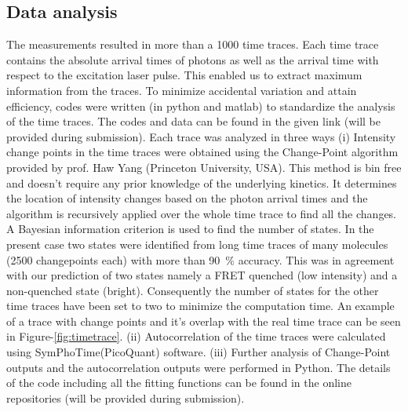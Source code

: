 \documentclass[journal=jacsat,manuscript=article]{achemso}
\begin{document}
\subsection{Data analysis}
The measurements resulted in more than a 1000 time traces.
Each time trace contains the absolute arrival times of photons as well as the arrival time with respect to the excitation laser pulse.
This enabled us to extract maximum information from the traces.
To minimize accidental variation and attain efficiency, codes were written (in python and matlab) to standardize the analysis of the time traces.
The codes and data can be found in the given link (will be provided during submission).
Each trace was analyzed in three ways (i) Intensity change points in the time traces were obtained using the Change-Point algorithm\cite{watkins2005detection} provided by prof. Haw Yang 
(Princeton University, USA).
This method is bin free and doesn't require any prior knowledge of the underlying kinetics.
It determines the location of intensity changes based on the photon arrival times and the algorithm is recursively applied over the whole time trace to find all the changes.
A Bayesian information criterion is used to find the number of states.
In the present case two states were identified from long time traces of many molecules (2500 changepoints each) with more than \SI{90}{\percent} accuracy.
This was in agreement with our prediction of two states namely a FRET quenched (low intensity) and a non-quenched state (bright).
Consequently the number of states for the other time traces have been set to two to minimize the computation time.
An example of a trace with change points and it's overlap with the real time trace can be seen in Figure-\ref{fig:timetrace}.
(ii) Autocorrelation of the time traces were calculated using SymPhoTime(PicoQuant) software.
(iii) Further analysis of Change-Point outputs and the autocorrelation outputs were performed in Python.
The details of the code including all the fitting functions can be found in the online repositories (will be provided during submission).
\end{document}

